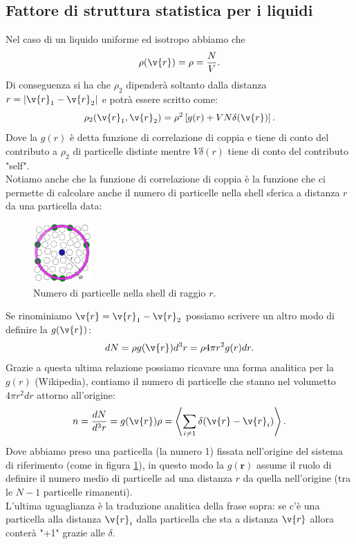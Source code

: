 \subsection{Fattore di struttura statistica per i liquidi}
\label{subsec:Fattore di struttura statistica per i liquidi}
Nel caso di un liquido uniforme ed isotropo abbiamo che 
\[
	\rho (\v{r}) = \rho = \frac{N}{V}
.\] 
Di conseguenza si ha che $\rho _2$ dipenderà soltanto dalla distanza $r = \left| \v{r}_1 - \v{r}_2 \right| $ e potrà essere scritto come:
\[
	\rho _2 (\v{r}_1, \v{r}_2) 
	=
	\rho ^2\left[ g(r)+VN\delta(\v{r}) \right] 
.\] 
Dove la $g(r)$ è detta funzione di correlazione di coppia e tiene di conto del contributo a $\rho _2$ di particelle distinte mentre $V\delta(r)$ tiene di conto del contributo "self".\\
Notiamo anche che la funzione di correlazione di coppia è la funzione che ci permette di calcolare anche il numero di particelle nella shell sferica a distanza $r$ da una particella data:
\begin{figure}[H]
	\centering
	\includegraphics[width=0.2\textwidth]{figures/Istantanea_2020-04-04_09-36-23.png}
	\caption{Numero di particelle nella shell di raggio $r$.}
	\label{fig:-figures-Istantanea_2020-04-04_09-36-23-png}
\end{figure}
\noindent
Se rinominiamo $\v{r}=\v{r}_1-\v{r}_2$ possiamo scrivere un altro modo di definire la $g(\v{r})$:
\[
    dN = \rho g(\v{r}) d^3r = \rho 4\pi r^2 g(r)dr
.\] 
Grazie a questa ultima relazione possiamo ricavare una forma analitica per la $g(r)$ (Wikipedia), contiamo il numero di particelle che stanno nel volumetto $4\pi r^2dr$ attorno all'origine:
\[
    n = \frac{dN}{d^3r} = g(\v{r}) \rho  = \left<\sum_{i\neq 1}^{} \delta (\v{r}-\v{r}_i) \right>
.\] 
Dove abbiamo preso una particella (la numero 1) fissata nell'origine del sistema di riferimento (come in figura \ref{fig:-figures-Istantanea_2020-04-04_09-36-23-png}), in questo modo la $g(\boldsymbol{r})$ assume il ruolo di definire il numero medio di particelle ad una distanza $r$ da quella nell'origine (tra le $N-1$ particelle rimanenti). \\
L'ultima uguaglianza è la traduzione analitica della frase sopra: se c'è una particella alla distanza $\v{r}_i$ dalla particella che sta a distanza $\v{r}$ allora conterà "+1" grazie alle $\delta$.\\
